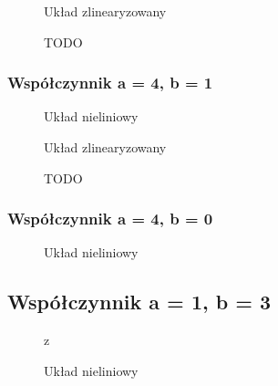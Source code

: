 \documentclass[a4paper, 10pt]{article}
\begin{document}
				
				\begin{figure}[H]
					\centering
					\def \svgwidth{0.75\columnwidth}
					
					\caption{Układ zlinearyzowany}
				\end{figure}\noindent
				
				
				\begin{figure}[H]
					\centering
					\def \svgwidth{0.75\columnwidth}
					
					\caption{TODO}
				\end{figure}\noindent
			
			\subsubsection{Współczynnik a = 4, b = 1}
				\begin{figure}[H]
					\centering
					\def \svgwidth{0.75\columnwidth}
					
					\caption{Układ nieliniowy}
				\end{figure}\noindent
				
				
				\begin{figure}[H]
					\centering
					\def \svgwidth{0.75\columnwidth}
					
					\caption{Układ zlinearyzowany}
				\end{figure}\noindent
				
				
				
				\begin{figure}[H]
					\centering
					\def \svgwidth{0.75\columnwidth}
					
					\caption{TODO}
				\end{figure}\noindent
				
			\subsubsection{Współczynnik a = 4, b = 0}
				\begin{figure}[H]
					\centering
					\def \svgwidth{0.75\columnwidth}
					
					\caption{Układ nieliniowy}
				\end{figure}\noindent
				
			\subsection{Współczynnik a = 1, b = 3}
				\begin{figure}[H]
					\centering
					\def \svgwidth{0.75\columnwidth}z
					
					\caption{Układ nieliniowy}
				\end{figure}\noindent
				
\end{document}
